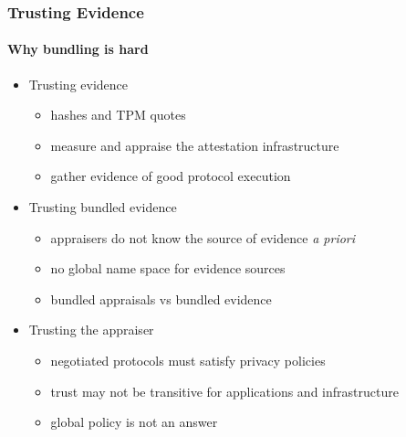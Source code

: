 \documentclass{beamer}
\begin{document}
\begin{frame}
  \frametitle{Trusting Evidence}
  \framesubtitle{Why bundling is hard}
  \begin{itemize}
  \item Trusting evidence
    \begin{itemize}
    \item hashes and TPM quotes
    \item measure and appraise the attestation infrastructure
    \item gather evidence of good protocol execution
    \end{itemize}
  \item Trusting bundled evidence
    \begin{itemize}
    \item appraisers do not know the source of evidence \emph{a
        priori}
    \item no global name space for evidence sources
    \item bundled appraisals vs bundled evidence
    \end{itemize}
  \item Trusting the appraiser
    \begin{itemize}
    \item negotiated protocols must satisfy privacy policies
    \item trust may not be transitive for applications and
      infrastructure
    \item global policy is not an answer
    \end{itemize}
  \end{itemize}
\end{frame}
\end{document}
